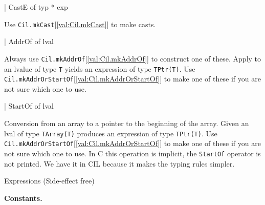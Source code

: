 \documentclass[11pt]{article}
\begin{document}
\begin{ocamldoccode}
  | CastE of typ * exp
\end{ocamldoccode}
\begin{ocamldoccomment}
Use {\tt{Cil.mkCast}}[\ref{val:Cil.mkCast}] to make casts.
\end{ocamldoccomment}
\begin{ocamldoccode}
  | AddrOf of lval
\end{ocamldoccode}
\begin{ocamldoccomment}
Always use {\tt{Cil.mkAddrOf}}[\ref{val:Cil.mkAddrOf}] to construct one of these. Apply to an 
 lvalue of type {\tt{T}} yields an expression of type {\tt{TPtr(T)}}. Use 
 {\tt{Cil.mkAddrOrStartOf}}[\ref{val:Cil.mkAddrOrStartOf}] to make one of these if you are not sure which 
 one to use.
\end{ocamldoccomment}
\begin{ocamldoccode}
  | StartOf of lval
\end{ocamldoccode}
\begin{ocamldoccomment}
Conversion from an array to a pointer to the beginning of the array. 
 Given an lval of type {\tt{TArray(T)}} produces an expression of type 
 {\tt{TPtr(T)}}. Use {\tt{Cil.mkAddrOrStartOf}}[\ref{val:Cil.mkAddrOrStartOf}] to make one of these if you are 
 not sure which one to use. In C this operation is implicit, the 
 {\tt{StartOf}} operator is not printed. We have it in CIL because it makes 
 the typing rules simpler.
\end{ocamldoccomment}
\begin{ocamldocdescription}
Expressions (Side-effect free)


\end{ocamldocdescription}




{\bf Constants.}
\end{document}
